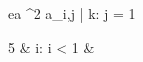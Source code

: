 \begin{eqcode}{e}{a }{^2}{}
  a_{i,j} | k: j = 1 \gets  %
  \begin{cases}
    5 & i: i < 1  & \otherwise \lend
  \end{cases} \lend
\end{eqcode}
